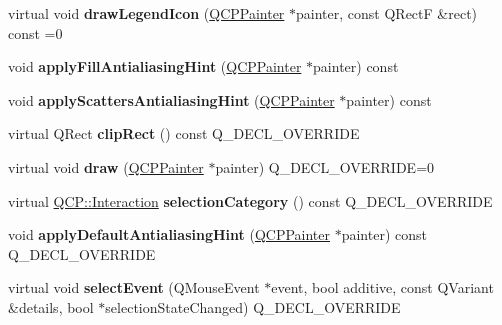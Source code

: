 \begin{DoxyCompactItemize}
virtual void {\bfseries draw\+Legend\+Icon} (\hyperlink{class_q_c_p_painter}{Q\+C\+P\+Painter} $\ast$painter, const Q\+RectF \&rect) const =0
\item 
\mbox{\label{class_q_c_p_abstract_plottable_a8d06a59ea23324cce6330ebf2262c0ed}} 
void {\bfseries apply\+Fill\+Antialiasing\+Hint} (\hyperlink{class_q_c_p_painter}{Q\+C\+P\+Painter} $\ast$painter) const
\item 
\mbox{\label{class_q_c_p_abstract_plottable_ac95f26b15a1e5d9c7bd2c0a46d760fc9}} 
void {\bfseries apply\+Scatters\+Antialiasing\+Hint} (\hyperlink{class_q_c_p_painter}{Q\+C\+P\+Painter} $\ast$painter) const
\item 
\mbox{\label{class_q_c_p_abstract_plottable_ac4553dcece65e1ee5a86bacd235f3eb5}} 
virtual Q\+Rect {\bfseries clip\+Rect} () const Q\+\_\+\+D\+E\+C\+L\+\_\+\+O\+V\+E\+R\+R\+I\+DE
\item 
\mbox{\label{class_q_c_p_abstract_plottable_a453f676a5cee7bf846c5f0fa05ea84b3}} 
virtual void {\bfseries draw} (\hyperlink{class_q_c_p_painter}{Q\+C\+P\+Painter} $\ast$painter) Q\+\_\+\+D\+E\+C\+L\+\_\+\+O\+V\+E\+R\+R\+I\+DE=0
\item 
\mbox{\label{class_q_c_p_abstract_plottable_ab90d413188d4ad5ab294bc35492a0e53}} 
virtual \hyperlink{namespace_q_c_p_a2ad6bb6281c7c2d593d4277b44c2b037}{Q\+C\+P\+::\+Interaction} {\bfseries selection\+Category} () const Q\+\_\+\+D\+E\+C\+L\+\_\+\+O\+V\+E\+R\+R\+I\+DE
\item 
\mbox{\label{class_q_c_p_abstract_plottable_ac032077fb0db93d6faa3273d02363398}} 
void {\bfseries apply\+Default\+Antialiasing\+Hint} (\hyperlink{class_q_c_p_painter}{Q\+C\+P\+Painter} $\ast$painter) const Q\+\_\+\+D\+E\+C\+L\+\_\+\+O\+V\+E\+R\+R\+I\+DE
\item 
\mbox{\label{class_q_c_p_abstract_plottable_ad8d84dab7ab1138e6e94b3c3f9a5cb0e}} 
virtual void {\bfseries select\+Event} (Q\+Mouse\+Event $\ast$event, bool additive, const Q\+Variant \&details, bool $\ast$selection\+State\+Changed) Q\+\_\+\+D\+E\+C\+L\+\_\+\+O\+V\+E\+R\+R\+I\+DE

\end{DoxyCompactItemize}
